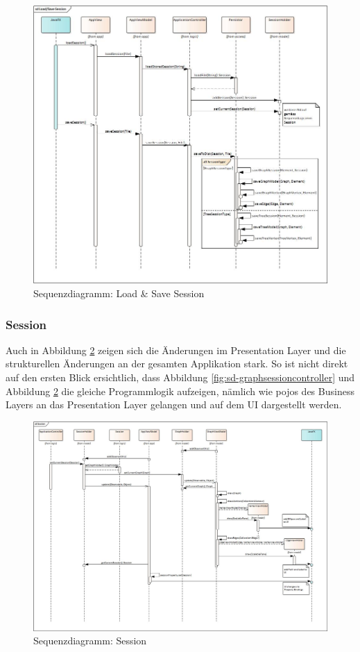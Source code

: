 \documentclass[11pt,a4paper,english,oneside]{book}
\numberwithin{equation}{chapter}
\begin{document}
	\begin{figure}[h!]
		\centering
		\includegraphics[width=\linewidth]{assets/images/sequence_LoadSave_Session}
		\caption{Sequenzdiagramm: Load \& Save Session}
		\label{fig:sd-load_save_session-2}
	\end{figure}
	
	
	\subsubsection{Session}	
	Auch in Abbildung \ref{fig:sd-session-2} zeigen sich die Änderungen im Presentation Layer und die strukturellen Änderungen an der gesamten Applikation stark. So ist nicht direkt auf den ersten Blick ersichtlich, dass Abbildung \ref{fig:sd-graphsessioncontroller} und Abbildung \ref{fig:sd-session-2} die gleiche Programmlogik aufzeigen, nämlich wie \gls{pojo}s des Business Layers an das Presentation Layer gelangen und auf dem UI dargestellt werden.
	
	\begin{figure}[h!]
		\centering
		\includegraphics[width=\linewidth]{assets/images/sequence_Session}
		\caption{Sequenzdiagramm: Session}
		\label{fig:sd-session-2}
	\end{figure}
\end{document}
